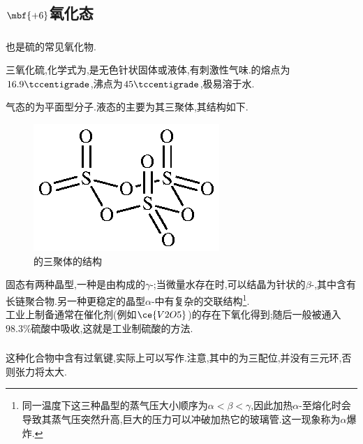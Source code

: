 \documentclass{ctexart}
\begin{document}
\subsection{$\mbf{+6}$氧化态}
\subsubsection{}
也是硫的常见氧化物.
\begin{substance}[\ce{SO3}]
    三氧化硫,化学式为,是无色针状固体或液体,有刺激性气味.的熔点为$16.9\tccentigrade$,沸点为$45\tccentigrade$,极易溶于水.
\end{substance}
气态的为平面型分子.液态的主要为其三聚体,其结构如下.
\begin{figure}[H]
    \centering\includegraphics{picture/S3O9.eps}
    \caption{的三聚体的结构}
\end{figure}
固态有两种晶型,一种是由构成的$\gamma$-;当微量水存在时,可以结晶为针状的$\beta$-,其中含有长链聚合物.另一种更稳定的晶型$\alpha$-中有复杂的交联结构\footnote{同一温度下这三种晶型的蒸气压大小顺序为$\alpha<\beta<\gamma$,因此加热$\alpha$-至熔化时会导致其蒸气压突然升高,巨大的压力可以冲破加热它的玻璃管.这一现象称为$\alpha$爆炸.}.\\
\indent 工业上制备通常在催化剂(例如$\ce{V2O5}$)的存在下氧化得到;随后一般被通入$98.3\%$硫酸中吸收,这就是工业制硫酸的方法.
\subsubsection{}
这种化合物中含有过氧键,实际上可以写作.注意,其中的为三配位,并没有三元环,否则张力将太大.
\end{document}
